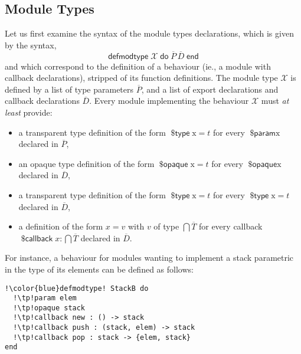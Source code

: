 \documentclass[a4paper,10pt]{article}
\DeclareMathOperator{\kwdefmt}{\textsf{defmodtype}}
\DeclareMathOperator{\kwend}{\textsf{end}}
\DeclareMathOperator{\kwdo}{\textsf{do}}
\DeclareMathOperator{\kwprm}{\textsf{\$param}}
\DeclareMathOperator{\kwopq}{\textsf{\$opaque}}
\DeclareMathOperator{\kwtp}{\textsf{\$type}}
\DeclareMathOperator{\kwclbk}{\textsf{\$callback}}
\newcommand{\tx}{\textrm{x}}
\newcommand{\BX}{\ensuremath{\mathcal{X}}}
\begin{document}
\subsection{Module Types}
Let us first examine the syntax of the module types declarations, which is given by the syntax, \[\kwdefmt \BX\kwdo \overline{P}\, \overline{D} \kwend\] and which correspond to the definition of a behaviour (ie., a module with callback declarations), stripped of its function definitions. The module type $\BX$ is defined by a list of type parameters $\overline{P}$, and a list of export declarations and callback declarations $\overline{D}$. Every module implementing the behaviour $\BX$ must \emph{at least} provide:
\begin{itemize}
    \item a transparent type definition of the form $\kwtp \tx = t$ for every $\kwprm \tx$ declared in $\overline{P}$,
    \item an opaque type definition of the form $\kwopq \tx = t$ for every $\kwopq \tx$ declared in $\overline{D}$,
    \item a transparent type definition of the form $\kwtp \tx = t$ for every $\kwtp \tx = t$ declared in $\overline{D}$,
    \item a definition of the form $x = v$  with $v$ of type $\bigcap\overline{T}$ for every callback $\kwclbk x : \bigcap \overline{T}$ declared in $\overline{D}$.
\end{itemize} 
For instance, a  behaviour for modules wanting to implement a stack parametric in the type of its elements can be defined as follows:
\begin{verbatim}
!\color{blue}defmodtype! StackB do
  !\tp!param elem
  !\tp!opaque stack
  !\tp!callback new : () -> stack
  !\tp!callback push : (stack, elem) -> stack
  !\tp!callback pop : stack -> {elem, stack}
end
\end{verbatim}
\end{document}

